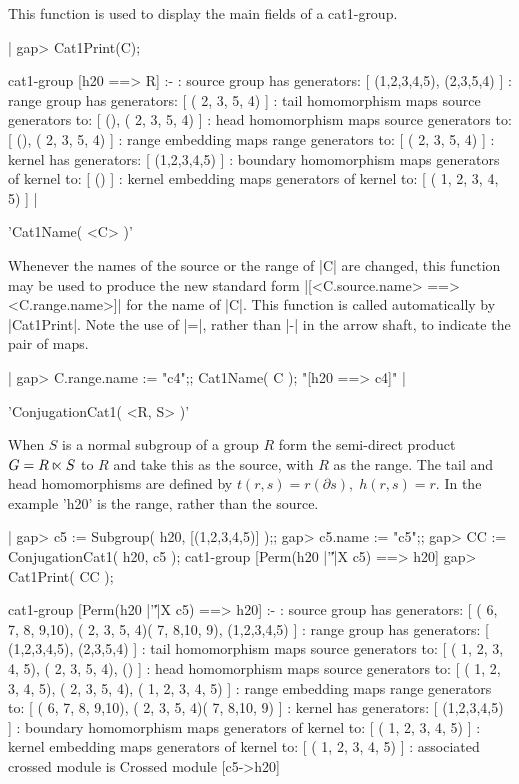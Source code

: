This function is used to display the main fields of a cat1-group.

|    gap> Cat1Print(C);

    cat1-group [h20 ==> R] :- 
    : source group has generators:
      [ (1,2,3,4,5), (2,3,5,4) ]
    : range group has generators:
      [ ( 2, 3, 5, 4) ]
    : tail homomorphism maps source generators to:
      [ (), ( 2, 3, 5, 4) ]
    : head homomorphism maps source generators to:
      [ (), ( 2, 3, 5, 4) ]
    : range embedding maps range generators to:
      [ ( 2, 3, 5, 4) ]
    : kernel has generators:
      [ (1,2,3,4,5) ]
    : boundary homomorphism maps generators of kernel to:
      [ () ]
    : kernel embedding maps generators of kernel to:
      [ ( 1, 2, 3, 4, 5) ]   |

%

'Cat1Name( <C> )'   

Whenever the names of the source or the range of |C| are changed, this
function    may    be  used    to  produce    the    new standard form
|[<C.source.name>   ==> <C.range.name>]| for  the   name of |C|.  This
function is called automatically by |Cat1Print|.  Note the use of |=|,
rather than |-| in the arrow shaft, to indicate the pair of maps.

|    gap> C.range.name := "c4";; Cat1Name( C ); 
    "[h20 ==> c4]"  | 
    
\newpage

%

'ConjugationCat1( <R, S> )'

When  $S$  is a normal subgroup  of  a group  $R$ form the semi-direct
product $G = R \semidirect S$ to $R$ and take this as the source, with
$R$ as  the range.   The tail and  head homomorphisms  are  defined by
$t(r,s) = r(\partial s), \; h(r,s) = r$.  In  the example 'h20' is the
range, rather than the source.

|    gap> c5 := Subgroup( h20, [(1,2,3,4,5)] );;
    gap> c5.name := "c5";;
    gap> CC := ConjugationCat1( h20, c5 );
    cat1-group [Perm(h20 |'\|'|X c5) ==> h20] 
    gap> Cat1Print( CC );

    cat1-group [Perm(h20 |'\|'|X c5) ==> h20] :- 
    : source group has generators:
      [ ( 6, 7, 8, 9,10), ( 2, 3, 5, 4)( 7, 8,10, 9), (1,2,3,4,5) ]
    :  range group has generators:
      [ (1,2,3,4,5), (2,3,5,4) ]
    : tail homomorphism maps source generators to:
      [ ( 1, 2, 3, 4, 5), ( 2, 3, 5, 4), () ]
    : head homomorphism maps source generators to:
      [ ( 1, 2, 3, 4, 5), ( 2, 3, 5, 4), ( 1, 2, 3, 4, 5) ]
    : range embedding maps range generators to:
      [ ( 6, 7, 8, 9,10), ( 2, 3, 5, 4)( 7, 8,10, 9) ]
    : kernel has generators:
      [ (1,2,3,4,5) ]
    : boundary homomorphism maps generators of kernel to:
      [ ( 1, 2, 3, 4, 5) ]
    : kernel embedding maps generators of kernel to:
      [ ( 1, 2, 3, 4, 5) ]
    : associated crossed module is Crossed module [c5->h20]

